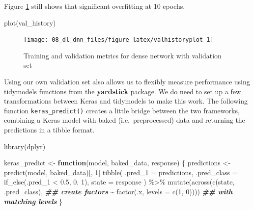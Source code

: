 \documentclass[
]{krantz}
\makeatletter
\newenvironment{Shaded}{\begin{snugshade}}{\end{snugshade}}
\newcommand{\AttributeTok}[1]{\textcolor[rgb]{0.77,0.63,0.00}{#1}}
\newcommand{\ControlFlowTok}[1]{\textcolor[rgb]{0.13,0.29,0.53}{\textbf{#1}}}
\newcommand{\DecValTok}[1]{\textcolor[rgb]{0.00,0.00,0.81}{#1}}
\newcommand{\DocumentationTok}[1]{\textcolor[rgb]{0.56,0.35,0.01}{\textbf{\textit{#1}}}}
\newcommand{\FloatTok}[1]{\textcolor[rgb]{0.00,0.00,0.81}{#1}}
\newcommand{\FunctionTok}[1]{\textcolor[rgb]{0.00,0.00,0.00}{#1}}
\newcommand{\NormalTok}[1]{#1}
\newcommand{\OtherTok}[1]{\textcolor[rgb]{0.56,0.35,0.01}{#1}}
\newcommand{\SpecialCharTok}[1]{\textcolor[rgb]{0.00,0.00,0.00}{#1}}
\newenvironment{kframe}{%
\medskip{}
\setlength{\fboxsep}{.8em}
 \def\at@end@of@kframe{}%
 \ifinner\ifhmode%
  \def\at@end@of@kframe{\end{minipage}}%
  \begin{minipage}{\columnwidth}%
 \fi\fi%
 \def\FrameCommand##1{\hskip\@totalleftmargin \hskip-\fboxsep
 \colorbox{shadecolor}{##1}\hskip-\fboxsep
     \hskip-\linewidth \hskip-\@totalleftmargin \hskip\columnwidth}%
 \MakeFramed {\advance\hsize-\width
   \@totalleftmargin\z@ \linewidth\hsize
   \@setminipage}}%
 {\par\unskip\endMakeFramed%
 \at@end@of@kframe}
\renewenvironment{Shaded}{\begin{kframe}}{\end{kframe}}
\makeatother
\begin{document}
Figure \ref{fig:valhistoryplot} still shows that significant overfitting at 10 epochs.

\begin{Shaded}
\begin{Highlighting}[]
\FunctionTok{plot}\NormalTok{(val\_history)}
\end{Highlighting}
\end{Shaded}

\begin{figure}

{\centering \texttt{[image: 08\_dl\_dnn\_files/figure-latex/valhistoryplot-1]} 

}

\caption{Training and validation metrics for dense network with validation set}\label{fig:valhistoryplot}
\end{figure}

Using our own validation set also allows us to flexibly measure performance using tidymodels functions from the \textbf{yardstick} package. We do need to set up a few transformations between Keras and tidymodels to make this work.
The following function \texttt{keras\_predict()} creates a little bridge between the two frameworks, combining a Keras model with baked (i.e.~preprocessed) data and returning the predictions in a tibble format.

\begin{Shaded}
\begin{Highlighting}[]
\FunctionTok{library}\NormalTok{(dplyr)}

\NormalTok{keras\_predict }\OtherTok{\textless{}{-}} \ControlFlowTok{function}\NormalTok{(model, baked\_data, response) \{}
\NormalTok{  predictions }\OtherTok{\textless{}{-}} \FunctionTok{predict}\NormalTok{(model, baked\_data)[, }\DecValTok{1}\NormalTok{]}
  \FunctionTok{tibble}\NormalTok{(}
    \AttributeTok{.pred\_1 =}\NormalTok{ predictions,}
    \AttributeTok{.pred\_class =} \FunctionTok{if\_else}\NormalTok{(.pred\_1 }\SpecialCharTok{\textless{}} \FloatTok{0.5}\NormalTok{, }\DecValTok{0}\NormalTok{, }\DecValTok{1}\NormalTok{),}
    \AttributeTok{state =}\NormalTok{ response}
\NormalTok{  ) }\SpecialCharTok{\%\textgreater{}\%}
    \FunctionTok{mutate}\NormalTok{(}\FunctionTok{across}\NormalTok{(}\FunctionTok{c}\NormalTok{(state, .pred\_class),            }\DocumentationTok{\#\# create factors}
                  \SpecialCharTok{\textasciitilde{}} \FunctionTok{factor}\NormalTok{(.x, }\AttributeTok{levels =} \FunctionTok{c}\NormalTok{(}\DecValTok{1}\NormalTok{, }\DecValTok{0}\NormalTok{))))  }\DocumentationTok{\#\# with matching levels}
\NormalTok{\}}
\end{Highlighting}
\end{Shaded}
\end{document}
